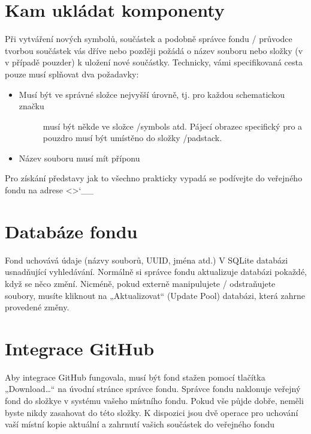 \documentclass[letterpaper,10pt,czech]{sphinxmanual}
\begin{document}
\section{Kam ukládat komponenty}
\label{\detokenize{pool-mgr:kam-ukladat-komponenty}}
Při vytváření nových symbolů, součástek a podobně správce fondu / průvodce  tvorbou součástek vás dříve nebo později požádá o název souboru nebo složky (v
v případě pouzder) k uložení nové součástky. Technicky, vámi specifikovaná cesta pouze musí splňovat dva požadavky:
\begin{itemize}
\item {} \begin{description}
\item[{Musí být ve správné  složce nejvyšší úrovně, tj. pro každou schematickou značku}] \leavevmode
musí být někde ve složce /symbols atd. Pájecí obrazec specifický pro a
pouzdro musí být umístěno do složky /padstack.

\end{description}

\item {} 
Název souboru musí mít příponu 

\end{itemize}

Pro získání představy jak to všechno prakticky vypadá se podívejte do veřejného fondu na adrese
\textless{}\textgreater{}{}`\_\_


\section{Databáze fondu}
\label{\detokenize{pool-mgr:databaze-fondu}}
Fond uchovává údaje (názvy souborů, UUID, jména atd.) V SQLite
databázi usnadňující vyhledávání. Normálně si správce fondu aktualizuje
databázi pokaždé, když se něco změní. Nicméně, pokud
externě manipulujete / odstraňujete soubory, musíte kliknout na „Aktualizovat“ (Update
Pool) databázi, která zahrne provedené změny.


\section{Integrace GitHub}
\label{\detokenize{pool-mgr:integrace-github}}
Aby integrace GitHub fungovala, musí být fond stažen pomocí
tlačítka „Download…“ na úvodní stránce správce fondu. Správce fondu naklonuje veřejný fond do složkye  v systému vašeho místního fondu. Pokud vše půjde dobře, neměli byste nikdy zasahovat do této složky. K dispozici jsou dvě operace pro uchování vaší místní kopie
aktuální a zahrnutí vašich součástek do veřejného fondu
\end{document}
